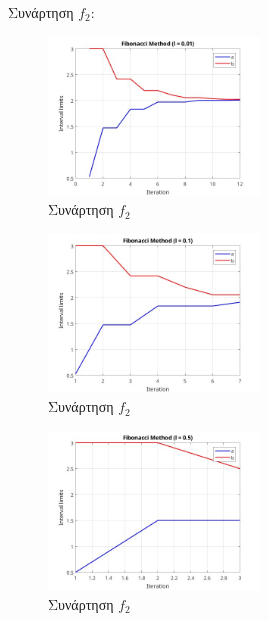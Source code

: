 Συνάρτηση $f_2$:
\begin{figure}[H] %
    \centering
    \includegraphics[width=0.5\textwidth]{media/fibonaccif2_001} %
    \caption{Συνάρτηση $f_2$}
\end{figure}
\begin{figure}[H] %
    \centering
    \includegraphics[width=0.5\textwidth]{media/fibonaccif2_01} %
    \caption{Συνάρτηση $f_2$}
\end{figure}
\begin{figure}[H] %
    \centering
    \includegraphics[width=0.5\textwidth]{media/fibonaccif2_05} %
    \caption{Συνάρτηση $f_2$}
\end{figure}

